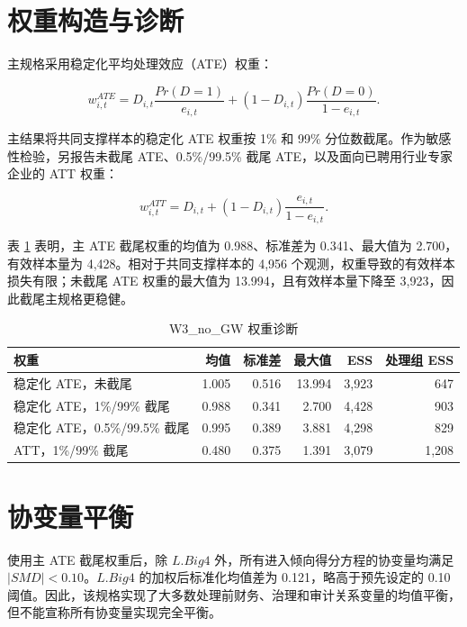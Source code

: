 \documentclass[12pt,a4paper]{article}
\begin{document}
\section{权重构造与诊断}

主规格采用稳定化平均处理效应（ATE）权重：

\begin{equation}
w^{ATE}_{i,t}=
D_{i,t}\frac{Pr(D=1)}{e_{i,t}}
+(1-D_{i,t})\frac{Pr(D=0)}{1-e_{i,t}}.
\end{equation}

主结果将共同支撑样本的稳定化 ATE 权重按 1\% 和 99\% 分位数截尾。作为敏感性检验，另报告未截尾 ATE、0.5\%/99.5\% 截尾 ATE，以及面向已聘用行业专家企业的 ATT 权重：

\begin{equation}
w^{ATT}_{i,t}=D_{i,t}+(1-D_{i,t})\frac{e_{i,t}}{1-e_{i,t}}.
\end{equation}

表 \ref{tab:weights} 表明，主 ATE 截尾权重的均值为 0.988、标准差为 0.341、最大值为 2.700，有效样本量为 4,428。相对于共同支撑样本的 4,956 个观测，权重导致的有效样本损失有限；未截尾 ATE 权重的最大值为 13.994，且有效样本量下降至 3,923，因此截尾主规格更稳健。

\begin{table}[htbp]
\centering
\caption{W3\_no\_GW 权重诊断}
\label{tab:weights}
\begin{tabular}{lrrrrr}
\toprule
权重 & 均值 & 标准差 & 最大值 & ESS & 处理组 ESS \\
\midrule
稳定化 ATE，未截尾 & 1.005 & 0.516 & 13.994 & 3,923 & 647 \\
稳定化 ATE，1\%/99\% 截尾 & 0.988 & 0.341 & 2.700 & 4,428 & 903 \\
稳定化 ATE，0.5\%/99.5\% 截尾 & 0.995 & 0.389 & 3.881 & 4,298 & 829 \\
ATT，1\%/99\% 截尾 & 0.480 & 0.375 & 1.391 & 3,079 & 1,208 \\
\bottomrule
\end{tabular}
\end{table}

\section{协变量平衡}

使用主 ATE 截尾权重后，除 $L.Big4$ 外，所有进入倾向得分方程的协变量均满足 $|SMD|<0.10$。$L.Big4$ 的加权后标准化均值差为 0.121，略高于预先设定的 0.10 阈值。因此，该规格实现了大多数处理前财务、治理和审计关系变量的均值平衡，但不能宣称所有协变量实现完全平衡。
\end{document}
